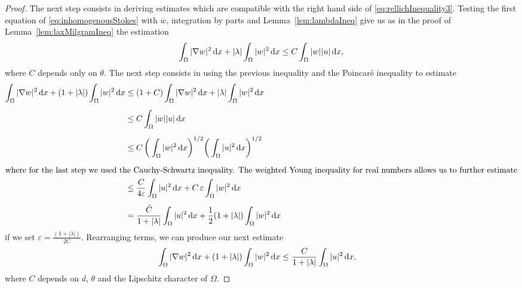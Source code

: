 \begin{proof}
  The next step consists in deriving estimates which are compatible with the right hand side of \eqref{eq:rellichInequality3}.
  Testing the first equation of \eqref{eq:inhomogenousStokes} with $\overline w$, integration by parts and Lemma~\ref{lem:lambdaIneq} give us as in the proof of Lemma~\ref{lem:laxMilgramIneq} the estimation
  \begin{align*}
    \int_\Omega |\nabla w|^2 \, {\operatorname{d}\!{x}} + |\lambda| \int_\Omega |w|^2 \, {\operatorname{d}\!{x}} \leq C \int_\Omega |w| |u| \, {\operatorname{d}\!{x}},
  \end{align*}
  where $C$ depends only on $\theta$.
  The next step consists in using the previous inequality and the Poincar\'{e} inequality to estimate
  \begin{align*}
    \int_\Omega |\nabla w|^2 \d x + (1 + |\lambda| ) \int_\Omega |w|^2 \d x 
    &\leq  (1 + C) \int_\Omega |\nabla w|^2 \d x + |\lambda| \int_\Omega |w|^2 \d x \\[0.5em]
    &\leq C \int_\Omega |w| |u| \d x \\[0.5em]
    &\leq C \, \bigg( \int_\Omega |w|^2 \d x \bigg)^{1/2} \bigg( \int_\Omega |u|^2 \d x \bigg)^{1/2}\\[0.5em]
    \intertext{where for the last step we used the Cauchy-Schwartz inequality. The weighted Young inequality for real numbers allows us to further estimate}
    &\leq \frac{C}{4\varepsilon} \int_\Omega |u|^2 \d x + C \, \varepsilon \int_\Omega |w|^2 \d x \\[0.5em]
    &= \frac{\tilde C}{1 + |\lambda|} \int_\Omega |u|^2 \d x + \frac{1}{2} ( 1 + |\lambda| ) \int_\Omega |w|^2 \d x
  \end{align*}
  if we set $\varepsilon = \frac{(1 + |\lambda|)}{2 C}$.
  Rearranging terms, we can produce our next estimate
  \begin{align}
    \int_\Omega |\nabla w|^2 \, {\operatorname{d}\!{x}} + ( 1 + |\lambda| ) \int_\Omega |w|^2 \, {\operatorname{d}\!{x}}
    &\leq \frac{C}{1 + |\lambda|} \int_\Omega |u|^2 \, {\operatorname{d}\!{x}},\label{eq:w2lambdaEstimate}
  \end{align}
  where $C$ depends on $d$, $\theta$ and the Lipschitz character of $\Omega$.


\end{proof}
